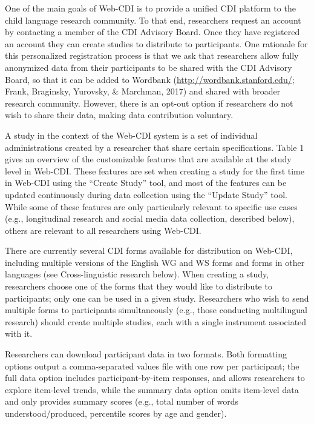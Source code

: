 \documentclass[
  english,
  ,man,floatsintext]{apa6}
\begin{document}
One of the main goals of Web-CDI is to provide a unified CDI platform to the child language research community. To that end, researchers request an account by contacting a member of the CDI Advisory Board. Once they have registered an account they can create studies to distribute to participants. One rationale for this personalized registration process is that we ask that researchers allow fully anonymized data from their participants to be shared with the CDI Advisory Board, so that it can be added to Wordbank (\url{http://wordbank.stanford.edu/}; Frank, Braginsky, Yurovsky, \& Marchman, 2017) and shared with broader research community. However, there is an opt-out option if researchers do not wish to share their data, making data contribution voluntary.

A study in the context of the Web-CDI system is a set of individual administrations created by a researcher that share certain specifications. Table 1 gives an overview of the customizable features that are available at the study level in Web-CDI. These features are set when creating a study for the first time in Web-CDI using the \enquote{Create Study} tool, and most of the features can be updated continuously during data collection using the \enquote{Update Study} tool. While some of these features are only particularly relevant to specific use cases (e.g., longitudinal research and social media data collection, described below), others are relevant to all researchers using Web-CDI.

There are currently several CDI forms available for distribution on Web-CDI, including multiple versions of the English WG and WS forms and forms in other languages (see Cross-linguistic research below). When creating a study, researchers choose one of the forms that they would like to distribute to participants; only one can be used in a given study. Researchers who wish to send multiple forms to participants simultaneously (e.g., those conducting multilingual research) should create multiple studies, each with a single instrument associated with it.

Researchers can download participant data in two formats. Both formatting options output a comma-separated values file with one row per participant; the full data option includes participant-by-item responses, and allows researchers to explore item-level trends, while the summary data option omits item-level data and only provides summary scores (e.g., total number of words understood/produced, percentile scores by age and gender).
\end{document}
